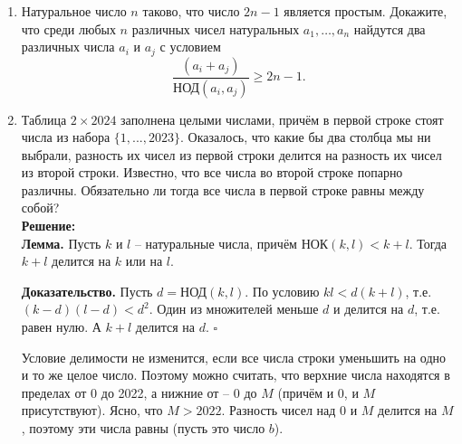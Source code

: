 \documentclass[a4paper,12pt]{article}
\begin{document}
\begin{enumerate}[label=\textbf{Задача \arabic*.}]
Ответ - числа вида $2019^{2^n \cdot 3^k} - 1$ для неотрицательных целых $k$ и $n$.

\item Натуральное число $n$ таково, что число $2n-1$ является простым. Докажите, что среди любых $n$ различных чисел натуральных $a_1, \ldots, a_n$ найдутся два различных числа $a_i$ и $a_j$ с условием 
$$
\dfrac {(a_i+a_j)}{\text{НОД}(a_i, a_j)} \geq 2n-1.
$$


\item Таблица $2 \times 2024$ заполнена целыми числами, причём в первой строке стоят числа из набора $\{1, ..., 2023\}$. Оказалось, что какие бы два столбца мы ни выбрали, разность их чисел из первой строки делится на разность их чисел из второй строки. Известно, что все числа во второй строке попарно различны. Обязательно ли тогда все числа в первой строке равны между собой? \\
\textbf{Решение:}  \\
\textbf{Лемма.} Пусть $k$ и $l$ -- натуральные числа, причём $\text{НОК}(k,l) < k+l$. Тогда $k+l$ делится на $k$ или на $l$.

\textbf{Доказательство.} Пусть $d = \text{НОД}(k,l)$. По условию $kl < d(k+l)$, т.е. $(k-d)(l-d) < d^2$. Один из множителей меньше $d$ и делится на $d$, т.е. равен нулю. А $k+l$ делится на $d$. $\square$

Условие делимости не изменится, если все числа строки уменьшить на одно и то же целое число. Поэтому можно считать, что верхние числа находятся в пределах от 0 до 2022, а нижние от -- 0 до $M$ (причём и 0, и $M$ присутствуют). Ясно, что $M > 2022$. Разность чисел над 0 и $M$ делится на $M$, поэтому эти числа равны (пусть это число $b$).


\end{enumerate}
\end{document}
